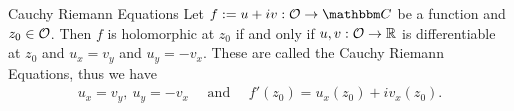 \documentclass[../ComplexAnalysis_Notes.tex]{subfiles}
\begin{document}
\begin{Thm}{Cauchy Riemann Equations}{}
  Let $f := u + iv : \mO \to \C$ be a function and $z_0 \in \mathcal{O}$. Then $f$ is holomorphic at $z_0$ if and only if $u,v : \mathcal{O} \to \mathbb{R}$ is differentiable at $z_0$ and $u_x = v_y$ and $u_y = - v_x$. These are called the Cauchy Riemann Equations, thus we have
  \begin{align*}
    u_x = v_y, \ u_y = -v_x \quad \mbox{ and } \quad f'(z_0) = u_x(z_0) + i v_x(z_0).
  \end{align*}
\end{Thm}
\end{document}
